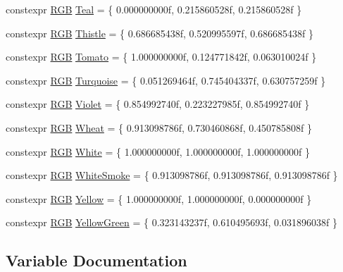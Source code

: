 \begin{DoxyCompactItemize}
\item 
constexpr \mbox{\hyperlink{structmage_1_1_r_g_b}{R\+GB}} \mbox{\hyperlink{namespacemage_1_1color_a80f897dd60d4faed02aeb55da726e013}{Teal}} = \{ 0.\+000000000f, 0.\+215860528f, 0.\+215860528f \}
\item 
constexpr \mbox{\hyperlink{structmage_1_1_r_g_b}{R\+GB}} \mbox{\hyperlink{namespacemage_1_1color_a83d1f3bdc2f2cd9008bd7b3595a7ebe2}{Thistle}} = \{ 0.\+686685438f, 0.\+520995597f, 0.\+686685438f \}
\item 
constexpr \mbox{\hyperlink{structmage_1_1_r_g_b}{R\+GB}} \mbox{\hyperlink{namespacemage_1_1color_a9b06c8cba67af690ad468fc816c33932}{Tomato}} = \{ 1.\+000000000f, 0.\+124771842f, 0.\+063010024f \}
\item 
constexpr \mbox{\hyperlink{structmage_1_1_r_g_b}{R\+GB}} \mbox{\hyperlink{namespacemage_1_1color_aec5f952221972849e7c9033eb2dc8dcf}{Turquoise}} = \{ 0.\+051269464f, 0.\+745404337f, 0.\+630757259f \}
\item 
constexpr \mbox{\hyperlink{structmage_1_1_r_g_b}{R\+GB}} \mbox{\hyperlink{namespacemage_1_1color_a2e9d37cb1ef054fad5b999c98e4bb80c}{Violet}} = \{ 0.\+854992740f, 0.\+223227985f, 0.\+854992740f \}
\item 
constexpr \mbox{\hyperlink{structmage_1_1_r_g_b}{R\+GB}} \mbox{\hyperlink{namespacemage_1_1color_a7e58d877ef2ef3fdfe2520b1e8090cdf}{Wheat}} = \{ 0.\+913098786f, 0.\+730460868f, 0.\+450785808f \}
\item 
constexpr \mbox{\hyperlink{structmage_1_1_r_g_b}{R\+GB}} \mbox{\hyperlink{namespacemage_1_1color_a39aae61faf172a41b44e2d308e1e4da6}{White}} = \{ 1.\+000000000f, 1.\+000000000f, 1.\+000000000f \}
\item 
constexpr \mbox{\hyperlink{structmage_1_1_r_g_b}{R\+GB}} \mbox{\hyperlink{namespacemage_1_1color_ad44d164eafa183126c9287e9a0d1d97d}{White\+Smoke}} = \{ 0.\+913098786f, 0.\+913098786f, 0.\+913098786f \}
\item 
constexpr \mbox{\hyperlink{structmage_1_1_r_g_b}{R\+GB}} \mbox{\hyperlink{namespacemage_1_1color_a4b2488da6699545c05afaf136a5315e5}{Yellow}} = \{ 1.\+000000000f, 1.\+000000000f, 0.\+000000000f \}
\item 
constexpr \mbox{\hyperlink{structmage_1_1_r_g_b}{R\+GB}} \mbox{\hyperlink{namespacemage_1_1color_a72c9b049fd1448d89ff65a5e9cabe044}{Yellow\+Green}} = \{ 0.\+323143237f, 0.\+610495693f, 0.\+031896038f \}
\end{DoxyCompactItemize}


\subsection{Variable Documentation}
\mbox{\label{namespacemage_1_1color_abd4f16c016b0f4447d08269b0ffb1332}} 

